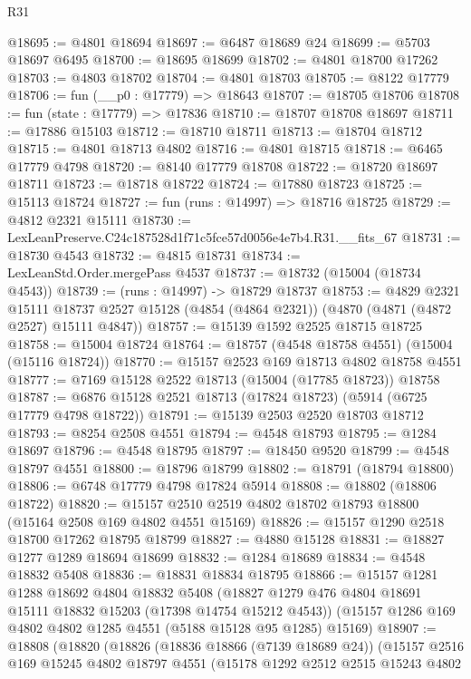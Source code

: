 \begin{lexlean}{R31}
\begin{coremodule}
@18695 := @4801 @18694
@18697 := @6487 @18689 @24
@18699 := @5703 @18697 @6495
@18700 := @18695 @18699
@18702 := @4801 @18700 @17262
@18703 := @4803 @18702
@18704 := @4801 @18703
@18705 := @8122 @17779
@18706 := fun (__p0 : @17779) => @18643
@18707 := @18705 @18706
@18708 := fun (state : @17779) => @17836
@18710 := @18707 @18708 @18697
@18711 := @17886 @15103
@18712 := @18710 @18711
@18713 := @18704 @18712
@18715 := @4801 @18713 @4802
@18716 := @4801 @18715
@18718 := @6465 @17779 @4798
@18720 := @8140 @17779 @18708
@18722 := @18720 @18697 @18711
@18723 := @18718 @18722
@18724 := @17880 @18723
@18725 := @15113 @18724
@18727 := fun (runs : @14997) => @18716 @18725
@18729 := @4812 @2321 @15111
@18730 := LexLeanPreserve.C24c187528d1f71c5fce57d0056e4e7b4.R31.__fits_67
@18731 := @18730 @4543
@18732 := @4815 @18731
@18734 := LexLeanStd.Order.mergePass @4537
@18737 := @18732 (@15004 (@18734 @4543))
@18739 := (runs : @14997) -> @18729 @18737
@18753 := @4829
    @2321
    @15111
    @18737
    @2527
    @15128
    (@4854 (@4864 @2321))
    (@4870 (@4871 (@4872 @2527) @15111 @4847))
@18757 := @15139 @1592 @2525 @18715 @18725
@18758 := @15004 @18724
@18764 := @18757 (@4548 @18758 @4551) (@15004 (@15116 @18724))
@18770 := @15157 @2523 @169 @18713 @4802 @18758 @4551
@18777 := @7169 @15128 @2522 @18713 (@15004 (@17785 @18723)) @18758
@18787 := @6876 @15128 @2521 @18713 (@17824 @18723) (@5914 (@6725 @17779 @4798 @18722))
@18791 := @15139 @2503 @2520 @18703 @18712
@18793 := @8254 @2508 @4551
@18794 := @4548 @18793
@18795 := @1284 @18697
@18796 := @4548 @18795
@18797 := @18450 @9520
@18799 := @4548 @18797 @4551
@18800 := @18796 @18799
@18802 := @18791 (@18794 @18800)
@18806 := @6748 @17779 @4798 @17824 @5914
@18808 := @18802 (@18806 @18722)
@18820 := @15157 @2510 @2519 @4802 @18702 @18793 @18800 (@15164 @2508 @169 @4802 @4551 @15169)
@18826 := @15157 @1290 @2518 @18700 @17262 @18795 @18799
@18827 := @4880 @15128
@18831 := @18827 @1277 @1289 @18694 @18699
@18832 := @1284 @18689
@18834 := @4548 @18832 @5408
@18836 := @18831 @18834 @18795
@18866 := @15157
    @1281
    @1288
    @18692
    @4804
    @18832
    @5408
    (@18827 @1279 @476 @4804 @18691 @15111 @18832 @15203 (@17398 @14754 @15212 @4543))
    (@15157 @1286 @169 @4802 @4802 @1285 @4551 (@5188 @15128 @95 @1285) @15169)
@18907 := @18808
    (@18820
      (@18826
        (@18836 @18866 (@7139 @18689 @24))
        (@15157
          @2516
          @169
          @15245
          @4802
          @18797
          @4551
          (@15178
            @1292
            @2512
            @2515
            @15243
            @4802

\end{coremodule}
\end{lexlean}
